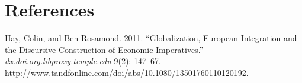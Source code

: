 \documentclass[11pt,article,oneside]{memoir}
\begin{document}
\pagebreak

\section{References}\label{references}

\setlength{\parindent}{-0.2in} \setlength{\leftskip}{0.2in}
\setlength{\parskip}{8pt} \vspace*{-0.2in} \noindent

Hay, Colin, and Ben Rosamond. 2011. ``Globalization, European
Integration and the Discursive Construction of Economic Imperatives.''
\emph{dx.doi.org.libproxy.temple.edu} 9(2): 147--67.
\url{http://www.tandfonline.com/doi/abs/10.1080/13501760110120192}.
\end{document}
